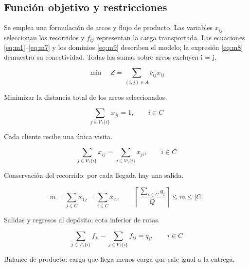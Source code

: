 \documentclass[11pt,a4paper]{article}
\numberwithin{equation}{section}
\begin{document}
\Needspace{110pt}

\subsection{Función objetivo y restricciones}

Se emplea una formulación de arcos y flujo de producto. Las variables \(x_{ij}\) seleccionan los recorridos y \(f_{ij}\) representan la carga transportada. Las ecuaciones \eqref{eq:m1}--\eqref{eq:m7} y los dominios \eqref{eq:m9} describen el modelo; la expresión \eqref{eq:m8} demuestra su conectividad. Todas las sumas sobre arcos excluyen i = j.



\begin{equation}\label{eq:m1}
\min\quad Z=\sum_{(i,j)\in A}c_{ij}x_{ij}
\end{equation}


Minimizar la distancia total de los arcos seleccionados.



\begin{equation}\label{eq:m2}
\sum_{j\in V\setminus\{i\}}x_{ji}=1,\qquad i\in C
\end{equation}


Cada cliente recibe una única visita.



\begin{equation}\label{eq:m3}
\sum_{j\in V\setminus\{i\}}x_{ij}=\sum_{j\in V\setminus\{i\}}x_{ji},\qquad i\in C
\end{equation}


Conservación del recorrido: por cada llegada hay una salida.



\begin{equation}\label{eq:m4}
m=\sum_{j\in C}x_{1j}=\sum_{i\in C}x_{i1},\qquad \left\lceil\frac{\sum_{i\in C}q_i}{Q}\right\rceil\le m\le |C|
\end{equation}


Salidas y regresos al depósito; cota inferior de rutas.



\begin{equation}\label{eq:m5}
\sum_{j\in V\setminus\{i\}}f_{ji}-\sum_{j\in V\setminus\{i\}}f_{ij}=q_i,\qquad i\in C
\end{equation}


Balance de producto: carga que llega menos carga que sale igual a la entrega.
\end{document}
